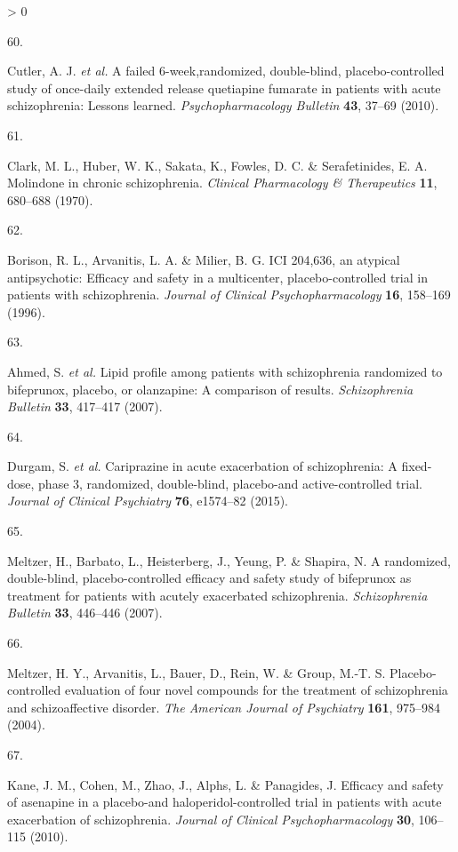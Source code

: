 \documentclass[
  9pt,
  english,
  ,jou,floatsintext]{apa6}
\newlength{\cslhangindent}
\newlength{\csllabelwidth}
\newenvironment{CSLReferences}[2] %
 {%
  \setlength{\parindent}{0pt}
  \ifodd #1 \everypar{\setlength{\hangindent}{\cslhangindent}}\ignorespaces\fi
  \ifnum #2 > 0
  \setlength{\parskip}{#2\baselineskip}
  \fi
 }%
 {}
\newcommand{\CSLLeftMargin}[1]{\parbox[t]{\csllabelwidth}{#1}}
\newcommand{\CSLRightInline}[1]{\parbox[t]{\linewidth - \csllabelwidth}{#1}\break}
\begin{document}
\begin{CSLReferences}{0}{0}
\leavevmode\hypertarget{ref-Cutler2010}{}%
\CSLLeftMargin{60. }
\CSLRightInline{Cutler, A. J. \emph{et al.} A failed 6-week,randomized, double-blind, placebo-controlled study of once-daily extended release quetiapine fumarate in patients with acute schizophrenia: Lessons learned. \emph{Psychopharmacology Bulletin} \textbf{43}, 37--69 (2010).}

\leavevmode\hypertarget{ref-Clark1970}{}%
\CSLLeftMargin{61. }
\CSLRightInline{Clark, M. L., Huber, W. K., Sakata, K., Fowles, D. C. \& Serafetinides, E. A. Molindone in chronic schizophrenia. \emph{Clinical Pharmacology \& Therapeutics} \textbf{11}, 680--688 (1970).}

\leavevmode\hypertarget{ref-Borison1996}{}%
\CSLLeftMargin{62. }
\CSLRightInline{Borison, R. L., Arvanitis, L. A. \& Milier, B. G. ICI 204,636, an atypical antipsychotic: Efficacy and safety in a multicenter, placebo-controlled trial in patients with schizophrenia. \emph{Journal of Clinical Psychopharmacology} \textbf{16}, 158--169 (1996).}

\leavevmode\hypertarget{ref-Ahmed2007}{}%
\CSLLeftMargin{63. }
\CSLRightInline{Ahmed, S. \emph{et al.} Lipid profile among patients with schizophrenia randomized to bifeprunox, placebo, or olanzapine: A comparison of results. \emph{{Schizophrenia Bulletin}} \textbf{33}, 417--417 (2007).}

\leavevmode\hypertarget{ref-Durgam2015}{}%
\CSLLeftMargin{64. }
\CSLRightInline{Durgam, S. \emph{et al.} Cariprazine in acute exacerbation of schizophrenia: A fixed-dose, phase 3, randomized, double-blind, placebo-and active-controlled trial. \emph{Journal of Clinical Psychiatry} \textbf{76}, e1574--82 (2015).}

\leavevmode\hypertarget{ref-Meltzer2007}{}%
\CSLLeftMargin{65. }
\CSLRightInline{Meltzer, H., Barbato, L., Heisterberg, J., Yeung, P. \& Shapira, N. A randomized, double-blind, placebo-controlled efficacy and safety study of bifeprunox as treatment for patients with acutely exacerbated schizophrenia. \emph{{Schizophrenia Bulletin}} \textbf{33}, 446--446 (2007).}

\leavevmode\hypertarget{ref-Meltzer2004}{}%
\CSLLeftMargin{66. }
\CSLRightInline{Meltzer, H. Y., Arvanitis, L., Bauer, D., Rein, W. \& Group, M.-T. S. Placebo-controlled evaluation of four novel compounds for the treatment of schizophrenia and schizoaffective disorder. \emph{The American Journal of Psychiatry} \textbf{161}, 975--984 (2004).}

\leavevmode\hypertarget{ref-Kane2010}{}%
\CSLLeftMargin{67. }
\CSLRightInline{Kane, J. M., Cohen, M., Zhao, J., Alphs, L. \& Panagides, J. Efficacy and safety of asenapine in a placebo-and haloperidol-controlled trial in patients with acute exacerbation of schizophrenia. \emph{Journal of Clinical Psychopharmacology} \textbf{30}, 106--115 (2010).}


\end{CSLReferences}
\end{document}
